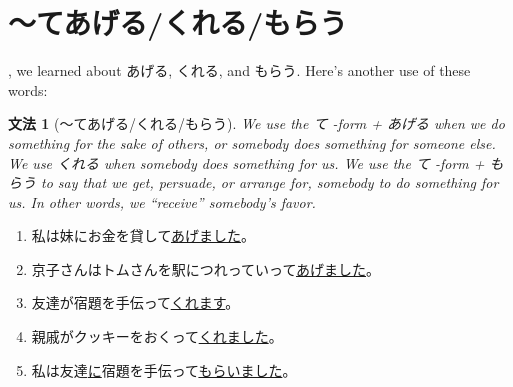 \documentclass[notoc,notitlepage]{tufte-book}
\newtheorem{grammar}{\faBook \enspace 文法}[section]
\begin{document}

\section{〜てあげる/くれる/もらう}%
\label{sec:_teageru_kureru_morau}

, we learned about あげる, くれる, and もらう. Here's another use of these words:

\begin{grammar}[〜てあげる/くれる/もらう]
\label{grammar:_teageru_kureru_morau}
  We use the て -form + あげる when we do something for the sake of others, or somebody does something for someone else. We use くれる when somebody does something for us. We use the て -form + もらう to say that we get, persuade, or arrange for, somebody to do something for us. In other words, we ``receive'' somebody's favor.
\end{grammar}

\begin{eg}
  \begin{enumerate}
    \item 私は妹にお金を貸して\underline{あげました}。
    \item 京子さんはトムさんを駅につれっていって\underline{あげました}。
    \item 友達が宿題を手伝って\underline{くれます}。
    \item 親戚がクッキーをおくって\underline{くれました}。
    \item 私は友達\underline{に}宿題を手伝って\underline{もらいました}。
  \end{enumerate}
\end{eg}
\end{document}
